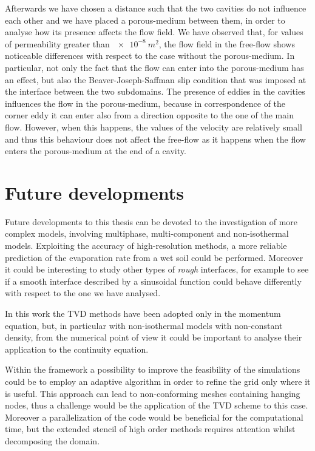 Afterwards we have chosen a distance such that the two cavities do not 
influence each other and we have placed a porous-medium between them, in order 
to analyse how its presence affects the flow field. We have observed that, 
for values of permeability greater than $\SI{e-8}{m^2}$, the flow field in the 
free-flow shows noticeable differences with respect to the case without the 
porous-medium. In particular, not only the fact that the flow can enter into 
the porous-medium has an effect, but also the Beaver-Joseph-Saffman slip 
condition that was imposed at the interface between the two subdomains. The 
presence of eddies in the cavities influences the flow in the 
porous-medium, because in correspondence of the corner eddy it can enter also 
from a direction opposite to the one of the main flow. However, when this 
happens, the values of the velocity are relatively small and thus this 
behaviour does not affect the free-flow as it happens when the flow enters the 
porous-medium at the end of a cavity.
%
\section{Future developments}
Future developments to this thesis can be devoted to the investigation of more 
complex models, involving multiphase, multi-component and non-isothermal 
models. Exploiting the accuracy of high-resolution methods, a more reliable 
prediction of the evaporation rate from a wet soil could be performed. Moreover it could be interesting to study other types of \emph{rough} interfaces, for example to see if a smooth interface described by a sinusoidal function could behave differently with respect to the one we have analysed.

In this work the TVD methods have been adopted only in the momentum equation, 
but, in particular with non-isothermal models with non-constant density, from 
the numerical point of view it could be important to analyse their 
application to the continuity equation.

Within the \DUMUX framework a possibility to improve the feasibility of the 
simulations could be to employ an adaptive algorithm in order to refine the grid 
only where it is useful. This approach can lead to non-conforming meshes 
containing hanging nodes, thus a challenge would be the application of the TVD 
scheme to this case. Moreover a parallelization of the code would be 
beneficial for the computational time, but the extended stencil of high order methods 
requires attention whilst decomposing the domain.